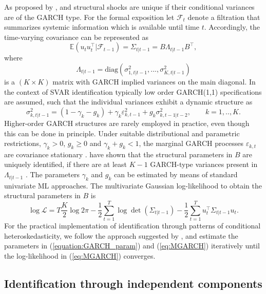 \documentclass[nojss]{jss}\usepackage[]{graphicx}\usepackage[]{color}
\begin{document}
As proposed by \cite{NP2004}, \cite{LS2007} and \cite{BouakezNormadin2010} structural shocks are unique if their conditional variances {are of the GARCH type}. For the formal exposition let $\mathcal{F}_t$ denote a filtration that summarizes systemic information which is available until time $t$. Accordingly, the time-varying covariance {can be represented as}
\begin{equation}
\mathbb{E}(u_tu_t^\top|\mathcal{F}_{t-1}) = \Sigma_{t|t-1} = B\Lambda_{t|t-1}B^\top,
\end{equation}
where
\begin{equation}
\Lambda_{t|t-1} = \text{diag}(\sigma^2_{1,t|t-1}, ..., \sigma^2_{K,t|t-1})
\end{equation}
is a $(K \times K)$ matrix with GARCH implied variances on the main diagonal. In the context of SVAR identification typically low order GARCH(1,1) specifications are assumed, such that the individual variances exhibit a dynamic structure as
\begin{equation}\label{equation:GARCH_param}
\sigma^2_{k,t|t-1} = (1 - \gamma_k - g_k) + \gamma_k\varepsilon^2_{k,t-1} + g_k\sigma^2_{k,t-1|t-2}, \qquad k = 1,..,K.
\end{equation}
Higher-order GARCH structures are rarely employed in practice, even though this can be done in principle. Under suitable distributional and parametric restrictions, $\gamma_k > 0$, $g_k \geq 0$ and $\gamma_k + g_k < 1$, the marginal GARCH processes $\varepsilon_{k,t}$ are covariance stationary \citep{MY2013}. \cite{SF2001} have shown that the structural parameters in $B$ are uniquely identified, if there are at least $K-1$ GARCH-type variances present in $\Lambda_{t|t-1}$ . The parameters $\gamma_k$ and $g_k$ can be estimated by means of standard univariate ML approaches. The multivariate Gaussian log-likelihood to obtain the structural parameters in $B$ is
\begin{equation}\label{eq:MGARCH}
\log \mathcal{L} = T\frac{K}{2}\log 2\pi -\frac{1}{2}\sum^T_{t=1}\log\det(\Sigma_{t|t-1}) -\frac{1}{2}\sum^T_{t=1}u^\top_t\Sigma_{t|t-1}u_t.
\end{equation}
For the practical implementation of identification through patterns of conditional heteroskedasticity, we follow the approach suggested by \cite{RePEc:eee:dyncon:v:73:y:2016:i:c:p:241-258}, and estimate the parameters in  (\ref{equation:GARCH_param}) and (\ref{eq:MGARCH}) iteratively until the log-likelihood  in (\ref{eq:MGARCH}) converges.

\subsection{Identification through independent components}
\end{document}
